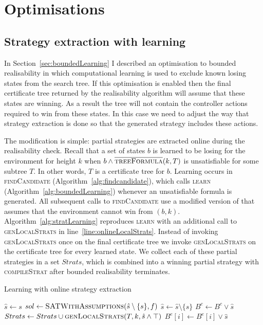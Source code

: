 \section{Optimisations}

\subsection{Strategy extraction with learning}

In Section~\ref{sec:boundedLearning} I described an optimisation to bounded realisability in which computational learning is used to exclude known losing states from the search tree. If this optimisation is enabled then the final certificate tree returned by the realisability algorithm will assume that these states are winning. As a result the tree will not contain the controller actions required to win from these states. In this case we need to adjust the way that strategy extraction is done so that the generated strategy includes these actions.

The modification is simple: partial strategies are extracted online during the realisability check. Recall that a set of states $b$ is learned to be losing for the environment for height $k$ when $b \land \textsc{$\overline{\mbox{treeFormula}}$}(k, T)$ is unsatisfiable for some subtree $T$.  In other words, $T$ is a certificate tree for $b$. Learning occurs in \textsc{findCandidate} (Algorithm~\ref{alg:findcandidate}), which calls \textsc{learn} (Algorithm~\ref{alg:boundedLearning}) whenever an unsatisfiable formula is generated.  All subsequent calls to \textsc{findCandidate} use a modified version of  that assumes that the environment cannot win from $(b, k)$.  Algorithm~\ref{alg:stratLearning} reproduces \textsc{learn} with an additional call to \textsc{genLocalStrats} in line~\ref{line:onlineLocalStrats}.  Instead of invoking \textsc{genLocalStrats} once on the final certificate tree we invoke \textsc{genLocalStrats} on the certificate tree for every learned state. We collect each of these partial strategies in a set $Strats$, which is combined into a winning partial strategy with \textsc{compileStrat} after bounded realisability terminates.

\begin{algorithm}
    \caption{Learning with online strategy extraction}
    \label{alg:stratLearning}
    \begin{algorithmic}
            \State $ \hat{s} \gets s$
            \State $sol \gets \Call{SATWithAssumptions}{\hat{s} \setminus \{ s \}, f}$
                    \State $\hat{s} \gets \hat{s} \setminus \{ s \}$
                \EndIf
            \EndFor
                \State $B^c \gets B^c \lor \hat{s}$
            \Else
                \State $Strats \gets Strats \cup \Call{genLocalStrats}{T, k, \hat{s} \land \top}$ \label{line:onlineLocalStrats}
                    \State $B^e[i] \gets B^e[i] \lor \hat{s}$
                \EndFor
            \EndIf
        \EndFunction
    \end{algorithmic}
\end{algorithm}

